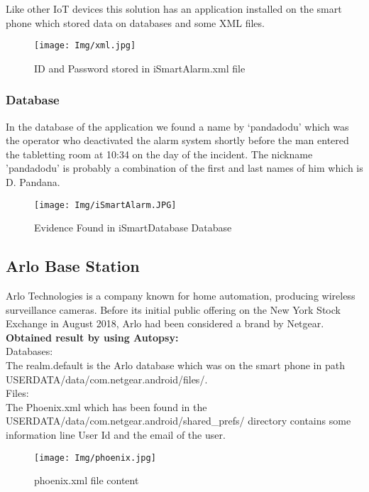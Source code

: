 \documentclass{easychair}
\begin{document}
\begin{enumerate}
 Like other IoT devices this solution has an application installed on the smart phone which stored data on databases and some XML files.
 
\begin{figure}[H]
    \centering
    \texttt{[image: Img/xml.jpg]}
    \caption{ID and Password stored in iSmartAlarm.xml file}
    \label{fig:my_label}
\end{figure}
\subsubsection{Database}
In the database of the application we found a name by ‘pandadodu’ which was the operator who deactivated the alarm system shortly before the man entered the tabletting room at 10:34 on the day of the incident. The nickname 'pandadodu' is probably a combination of the first and last names of him which is D. Pandana.
\begin{figure}[H]
    \centering
    \texttt{[image: Img/iSmartAlarm.JPG]}
    \caption{Evidence Found in iSmartDatabase Database}
    \label{fig:ISMD}
\end{figure}
 
\subsection{Arlo Base Station}
Arlo Technologies is a company known for home automation, producing wireless surveillance cameras. Before its initial public offering on the New York Stock Exchange in August 2018, Arlo had been considered a brand by Netgear.\\

\textbf{Obtained result by using Autopsy:}\\

Databases:\\
The realm.default is the Arlo database which was on the smart phone in path USERDATA/data/com.netgear.android/files/.\\

Files:\\
The Phoenix.xml which has been found in the USERDATA/data/com.netgear.android/shared\_prefs/ directory contains some information line User Id and the email of the user.
\begin{figure}[H]
    \centering
    \texttt{[image: Img/phoenix.jpg]}
    \caption{phoenix.xml file content}
    \label{fig:my_label}
\end{figure}


\end{enumerate}
\end{document}
